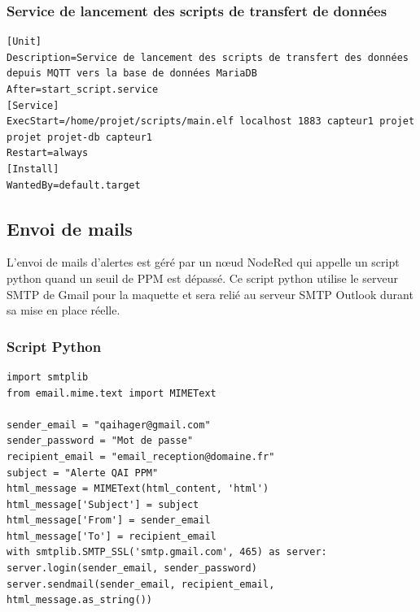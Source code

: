\documentclass[a4paper,11pt]{article}
\begin{document}
        \subsubsection{Service de lancement des scripts de transfert de données}
        \begin{lstlisting}[style=bash, caption={Service de lancement du script de transfert des données}]
[Unit]
Description=Service de lancement des scripts de transfert des données depuis MQTT vers la base de données MariaDB
After=start_script.service
[Service]
ExecStart=/home/projet/scripts/main.elf localhost 1883 capteur1 projet projet projet-db capteur1
Restart=always
[Install]
WantedBy=default.target
        \end{lstlisting}
        \newpage
        \subsection{Envoi de mails}
        L'envoi de mails d'alertes est géré par un n\oe{}ud NodeRed qui appelle un script python quand un seuil de PPM est dépassé.
        Ce script python utilise le serveur SMTP de Gmail pour la maquette et sera relié au serveur SMTP Outlook durant sa mise en place réelle.
        \subsubsection{Script Python}
        \begin{lstlisting}[style=python, caption={Script python d'envoi de mails}]
import smtplib
from email.mime.text import MIMEText

sender_email = "qaihager@gmail.com"
sender_password = "Mot de passe"
recipient_email = "email_reception@domaine.fr"
subject = "Alerte QAI PPM"
html_message = MIMEText(html_content, 'html')
html_message['Subject'] = subject
html_message['From'] = sender_email
html_message['To'] = recipient_email
with smtplib.SMTP_SSL('smtp.gmail.com', 465) as server:
server.login(sender_email, sender_password)
server.sendmail(sender_email, recipient_email, html_message.as_string())
        \end{lstlisting}
\end{document}

